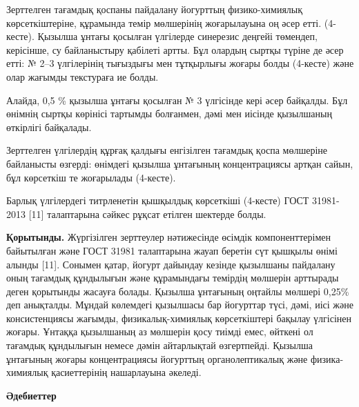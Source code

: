 \begin{multicols}{2}
Зерттелген тағамдық қоспаны пайдалану йогурттың физико-химиялық
көрсеткіштеріне, құрамында темір мөлшерінің жоғарылауына оң әсер етті.
(4-кесте). Қызылша ұнтағы қосылған үлгілерде синерезис деңгейі төмендеп,
керісінше, су байланыстыру қабілеті артты. Бұл олардың сыртқы түріне де
әсер етті: № 2--3 үлгілерінің тығыздығы мен тұтқырлығы жоғары болды
(4-кесте) және олар жағымды текстураға ие болды.

Алайда, 0,5 \% қызылша ұнтағы қосылған № 3 үлгісінде кері әсер байқалды.
Бұл өнімнің сыртқы көрінісі тартымды болғанмен, дәмі мен иісінде
қызылшаның өткірлігі байқалады.

Зерттелген үлгілердің құрғақ қалдығы енгізілген тағамдық қоспа мөлшеріне
байланысты өзгерді: өнімдегі қызылша ұнтағының концентрациясы артқан
сайын, бұл көрсеткіш те жоғарылады (4-кесте).

Барлық үлгілердегі титрленетін қышқылдық көрсеткіші (4-кесте) ГОСТ
31981-2013 {[}11{]} талаптарына сәйкес рұқсат етілген шектерде болды.

{\bfseries Қорытынды.} Жүргізілген зерттеулер нәтижесінде өсімдік
компоненттерімен байытылған және ГОСТ 31981 талаптарына жауап беретін
сүт қышқылы өнімі алынды {[}11{]}. Сонымен қатар, йогурт дайындау
кезінде қызылшаны пайдалану оның тағамдық құндылығын және құрамындағы
темірдің мөлшерін арттырады деген қорытынды жасауға болады. Қызылша
ұнтағының оңтайлы мөлшері 0,25\% деп анықталды. Мұндай көлемдегі
қызылшасы бар йогурттар түсі, дәмі, иісі және консистенциясы жағымды,
физикалық-химиялық көрсеткіштері бақылау үлгісінен жоғары. Ұнтаққа
қызылшаның аз мөлшерін қосу тиімді емес, өйткені ол тағамдық құндылығын
немесе дәмін айтарлықтай өзгертпейді. Қызылша ұнтағының жоғары
концентрациясы йогурттың органолептикалық және физика-химиялық
қасиеттерінің нашарлауына әкеледі.
\end{multicols}

\begin{center}
{\bfseries Әдебиеттер}
\end{center}

